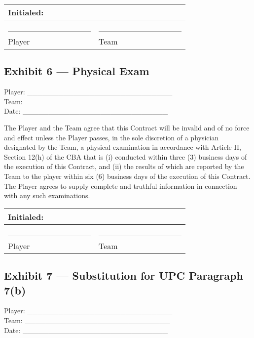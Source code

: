 \documentclass[
]{book}
\begin{document}
\begin{longtable}[]{@{}ll@{}}
\toprule()
Initialed: & \\
\midrule()
\endhead
\_\_\_\_\_\_\_\_\_\_\_\_\_\_ & \_\_\_\_\_\_\_\_\_\_\_\_\_\_ \\
Player & Team \\
\bottomrule()
\end{longtable}

\newpage

\hypertarget{exhibit-6-physical-exam}{%
\subsection{Exhibit 6 --- Physical Exam}\label{exhibit-6-physical-exam}}

Player: \_\_\_\_\_\_\_\_\_\_\_\_\_\_\_\_\_\_\_\_\_\_\_\_\_\_\_\_\\
Team: \_\_\_\_\_\_\_\_\_\_\_\_\_\_\_\_\_\_\_\_\_\_\_\_\_\_\_\_\\
Date: \_\_\_\_\_\_\_\_\_\_\_\_\_\_\_\_\_\_\_\_\_\_\_\_\_\_\_\_

The Player and the Team agree that this Contract will be invalid and of no force and effect unless the Player passes, in the sole discretion of a physician designated by the Team, a physical examination in accordance with Article II, Section 12(h) of the CBA that is (i) conducted within three (3) business days of the execution of this Contract, and (ii) the results of which are reported by the Team to the player within six (6) business days of the execution of this Contract. The Player agrees to supply complete and truthful information in connection with any such examinations.

\begin{longtable}[]{@{}ll@{}}
\toprule()
Initialed: & \\
\midrule()
\endhead
\_\_\_\_\_\_\_\_\_\_\_\_\_\_ & \_\_\_\_\_\_\_\_\_\_\_\_\_\_ \\
Player & Team \\
\bottomrule()
\end{longtable}

\newpage

\hypertarget{exhibit-7-substitution-for-upc-paragraph-7b}{%
\subsection{Exhibit 7 --- Substitution for UPC Paragraph 7(b)}\label{exhibit-7-substitution-for-upc-paragraph-7b}}

Player: \_\_\_\_\_\_\_\_\_\_\_\_\_\_\_\_\_\_\_\_\_\_\_\_\_\_\_\_\\
Team: \_\_\_\_\_\_\_\_\_\_\_\_\_\_\_\_\_\_\_\_\_\_\_\_\_\_\_\_\\
Date: \_\_\_\_\_\_\_\_\_\_\_\_\_\_\_\_\_\_\_\_\_\_\_\_\_\_\_\_
\end{document}
